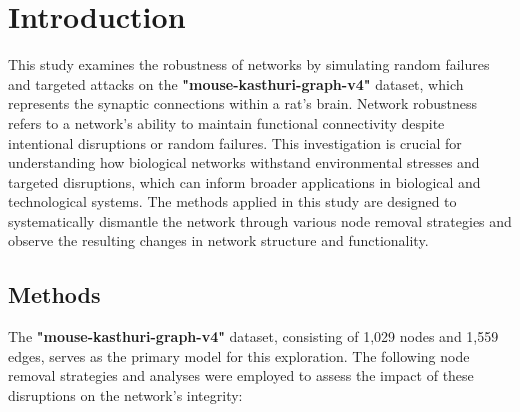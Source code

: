\documentclass[
	report, %
	11pt, %
]{CSUniSchoolLabReport}
\newcounter{ct}
\begin{document}
\tableofcontents %
\thispagestyle{empty}
\pagebreak

\section{Introduction}

This study examines the robustness of networks by simulating random failures and targeted attacks on the \textbf{"mouse-kasthuri-graph-v4"} dataset, which represents the synaptic connections within a rat's brain. Network robustness refers to a network's ability to maintain functional connectivity despite intentional disruptions or random failures. This investigation is crucial for understanding how biological networks withstand environmental stresses and targeted disruptions, which can inform broader applications in biological and technological systems. The methods applied in this study are designed to systematically dismantle the network through various node removal strategies and observe the resulting changes in network structure and functionality.

\subsection{Methods}

The \textbf{"mouse-kasthuri-graph-v4"} dataset, consisting of 1,029 nodes and 1,559 edges, serves as the primary model for this exploration. The following node removal strategies and analyses were employed to assess the impact of these disruptions on the network's integrity:
\end{document}
